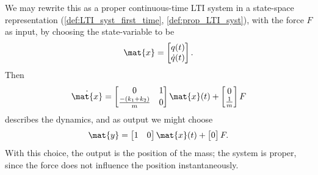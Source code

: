 \begin{example}
    We may rewrite this as a proper continuous-time LTI system in a state-space representation (\cref{def:LTI_syst_first_time}, \cref{def:prop_LTI_syst}), with the force $F$ as input, by choosing the state-variable to be
    \begin{equation}\label{eq:LTI-exa-double-spring-state}
        \mat{x} =
        \begin{bmatrix}
            q(t) \\
            \dot{q}(t)
        \end{bmatrix}.
    \end{equation}
    Then
    \begin{equation}\label{eq:LTI-exa-double-spring-dynamics}
        \dot{\mat{x}} =
        \begin{bmatrix}
            0                       & 1 \\
            \tfrac{-(k_1 + k_2)}{m} & 0
        \end{bmatrix}
        \mat{x}(t) +
        \begin{bmatrix}
            0 \\
            \tfrac{1}{m}
        \end{bmatrix}
        F
    \end{equation}
    describes the dynamics, and as output we might choose
    \begin{equation}\label{eq:LTI-exa-double-spring-readout}
        \mat{y} =
        \begin{bmatrix}
            1 & 0
        \end{bmatrix}
        \mat{x}(t) +
        \begin{bmatrix}
            0
        \end{bmatrix}
        F.
    \end{equation}
    With this choice, the output is the position of the mass; the system is proper, since the force does not influence the position instantaneously.
\end{example}

